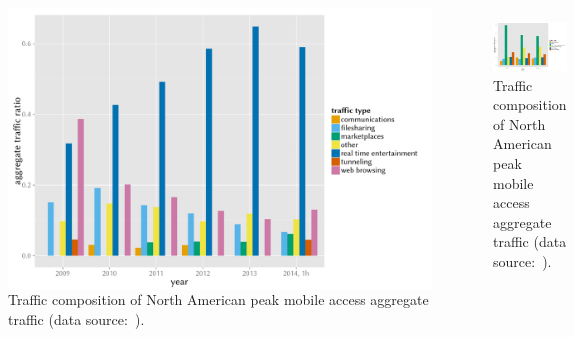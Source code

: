 \documentclass{beamer}
\begin{document}






\begin{frame}
\end{frame}




\begin{frame}
\begin{figure}
	\begin{columns}[T]
		\centering
		\includegraphics[width=0.9\columnwidth]{../../chapters/01-intro/images/r-netvine-phenomena-fixed.pdf}
		\caption{Traffic composition of North American peak fixed access aggregate traffic (data source:~\cite{sandvine_internetphenomena}).}
		\begin{figure}
			\centering
			\includegraphics[width=0.9\columnwidth]{../../chapters/01-intro/images/r-netvine-phenomena-mobile.pdf}
			\caption{Traffic composition of North American peak mobile access aggregate traffic (data source:~\cite{sandvine_internetphenomena}).}
		\end{figure}
	\end{columns}

\end{figure}
\end{frame}
\end{document}
